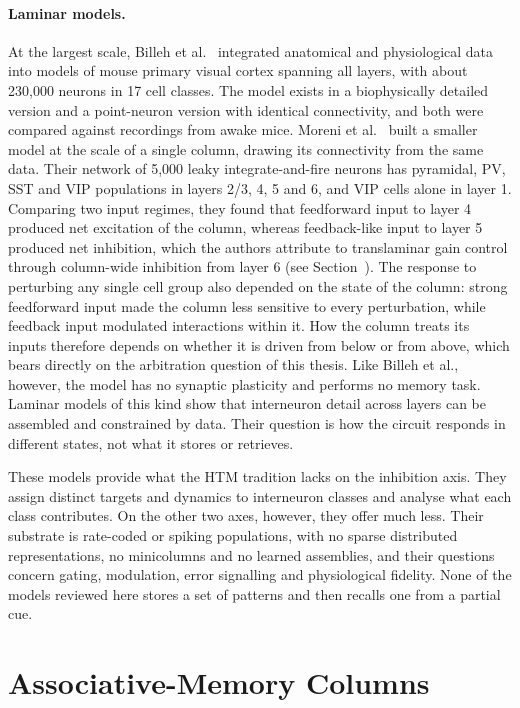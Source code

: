 \paragraph{Laminar models.}
At the largest scale, Billeh et al.~\cite{billeh2020systematic} integrated
anatomical and physiological data into models of mouse primary visual cortex
spanning all layers, with about 230,000 neurons in 17 cell classes. The model
exists in a biophysically detailed version and a point-neuron version with
identical connectivity, and both were compared against recordings from awake
mice. Moreni et al.~\cite{moreni2025celltype} built a smaller model at the
scale of a single column, drawing its connectivity from the same data. Their
network of 5,000 leaky integrate-and-fire neurons has pyramidal, PV, SST and
VIP populations in layers 2/3, 4, 5 and 6, and VIP cells alone in layer 1.
Comparing two input regimes, they found that feedforward input to layer 4
produced net excitation of the column, whereas feedback-like input to layer 5
produced net inhibition, which the authors attribute to translaminar gain
control through column-wide inhibition from layer 6 (see Section~). The
response to perturbing any single cell group also depended on the state of the
column: strong feedforward input made the column less sensitive to every
perturbation, while feedback input modulated interactions within it. How the
column treats its inputs therefore depends on whether it is driven from below
or from above, which bears directly on the arbitration question of this
thesis. Like Billeh et al., however, the model has no synaptic plasticity and
performs no memory task. Laminar models of this kind show that interneuron
detail across layers can be assembled and constrained by data. Their question
is how the circuit responds in different states, not what it stores or
retrieves.

These models provide what the HTM tradition lacks on the inhibition axis. They
assign distinct targets and dynamics to interneuron classes and analyse what
each class contributes. On the other two axes, however, they offer much less.
Their substrate is rate-coded or spiking populations, with no sparse
distributed representations, no minicolumns and no learned assemblies, and
their questions concern gating, modulation, error signalling and physiological
fidelity. None of the models reviewed here stores a set of patterns and then
recalls one from a partial cue.

\section{Associative-Memory Columns}
\label{sec:comp-attractor}

